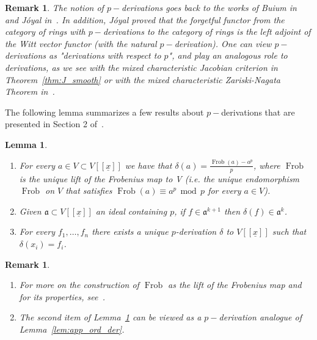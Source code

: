 \documentclass{article}
\newtheorem{lemma}[theorem]{Lemma}
\newtheorem{remark}[theorem]{Remark}
\DeclareMathOperator{\Frob}{Frob}
\newcommand{\Vx}{V[[\underline{x}]]}
\numberwithin{theorem}{section}
\renewcommand{\mod}{\,\operatorname{mod}\,}
\begin{document}
\begin{remark}
    \textup{ The notion of $p-$derivations goes back to the works of Buium in~\cite{buium1995differential} and J\'{o}yal in~\cite{joyal1985delta}. In addition, J\'{o}yal proved that the forgetful functor from the category of rings with $p-$derivations to the category of rings is the left adjoint of the Witt vector functor (with the natural $p-$derivation). One can view $p-$derivations as "derivations with respect to $p$", and play an analogous role to derivations, as we see with the mixed characteristic Jacobian criterion in Theorem~\ref{thm:J_smooth} or with the mixed characteristic Zariski-Nagata Theorem in~\cite{de2020zariski, de2025differential}. } 
\end{remark}


The following lemma summarizes a few results about $p-$derivations that are presented in Section 2 of~\cite{hochster2021jacobian}.

\begin{lemma}\label{lem:basic_delta}
    \begin{enumerate}
        \item For every $a \in V \subset \Vx$ we have that $\delta\left(a\right)=\frac{\Frob(a)-a^p}{p}$, where $\Frob$ is the unique lift of the Frobenius map to V (i.e. the unique endomorphism $\Frob$ on $V$ that satisfies $\Frob(a)\equiv a^p \mod  p$ for every $a\in V$). 
        \item Given $\mathfrak{a} \subset \Vx$  an ideal containing $p$, if $f \in \mathfrak{a}^{k+1}$ then $\delta\left(f\right) \in \mathfrak{a}^k$.
        \item For every $f_1, \dots, f_n$ there exists a unique $p$-derivation $\delta$ to $\Vx$ such that $\delta\left(x_i\right)=f_i$. 
    \end{enumerate}
\end{lemma}

\begin{remark}
\begin{enumerate}
    \item \textup{For more on the construction of $\Frob$ as the lift of the Frobenius map and for its properties, see~\cite{davis2014witt}.}
    \item \textup{The second item of Lemma~\ref{lem:basic_delta} can be viewed as a $p-$derivation analogue of Lemma~\ref{lem:app_ord_der}.}
\end{enumerate}
\end{remark}
\end{document}
